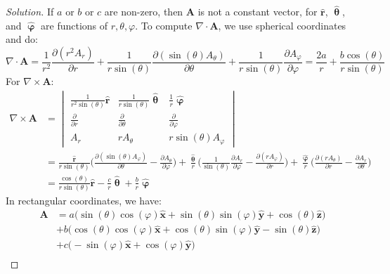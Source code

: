 \documentclass{article}
\theoremstyle{mystyle}
\begin{document}
\begin{proof}[Solution]
If $a$ or $b$ or $c$ are non-zero, then $\mathbf{A}$ is not a constant vector, for $\hat{\mathbf{r}}$, $\hat{\boldsymbol{\uptheta}}$, and $\hat{\boldsymbol{\upvarphi}}$ are functions of $r,\theta,\varphi$. To compute $\nabla \cdot \mathbf{A}$, we use spherical coordinates and do:
\begin{equation*}
    \nabla\cdot\mathbf{A}=\frac{1}{r^{2}}\frac{\partial (r^{2}A_{r})}{\partial r}+\frac{1}{r\sin(\theta)}\frac{\partial(\sin(\theta)A_{\theta})}{\partial \theta}+\frac{1}{r\sin(\theta)}\frac{\partial A_{\varphi}}{\partial\varphi}=\frac{2a}{r}+\frac{b\cos(\theta)}{r\sin(\theta)}
\end{equation*}
For $\nabla \times \mathbf{A}$:
\begin{align*}
    \nabla \times \mathbf{A} &= \begin{vmatrix} \frac{1}{r^{2}\sin(\theta)}\hat{\mathbf{r}} & \frac{1}{r\sin(\theta)}\hat{\boldsymbol{\uptheta}} & \frac{1}{r}\hat{\boldsymbol{\upvarphi}}\\ \frac{\partial}{\partial r} & \frac{\partial}{\partial \theta} & \frac{\partial}{\partial \varphi}\\ A_{r} & rA_{\theta} & r\sin(\theta)A_{\varphi} \end{vmatrix}\\
    &= \frac{\hat{\mathbf{r}}}{r\sin(\theta)}\bigg(\frac{\partial (\sin(\theta)A_{\varphi})}{\partial \theta} - \frac{\partial A_{\theta}}{\partial \varphi}\bigg) + \frac{\hat{\boldsymbol{\uptheta}}}{r}\bigg(\frac{1}{\sin(\theta)}\frac{\partial A_{r}}{\partial \varphi} - \frac{\partial (rA_{\varphi})}{\partial r}\bigg)+\frac{\hat{\boldsymbol{\upvarphi}}}{r}\bigg(\frac{\partial (rA_{\theta})}{\partial r} - \frac{\partial A_{r}}{\partial \theta}\bigg)\\
    &= \frac{\cos(\theta)}{r\sin(\theta)}\hat{\mathbf{r}}-\frac{c}{r}\hat{\boldsymbol{\uptheta}}+\frac{b}{r}\hat{\boldsymbol{\upvarphi}}
\end{align*}
In rectangular coordinates, we have:
\begin{align*}
    \mathbf{A}  &= a\big(\sin(\theta)\cos(\varphi)\hat{\mathbf{x}}+\sin(\theta)\sin(\varphi)\hat{\mathbf{y}}+\cos(\theta)\hat{\mathbf{z}}\big)\\
                &+ b\big(\cos(\theta)\cos(\varphi)\hat{\mathbf{x}} + \cos(\theta)\sin(\varphi)\hat{\mathbf{y}}-\sin(\theta)\hat{\mathbf{z}}\big)\\
                &+ c\big(-\sin(\varphi)\hat{\mathbf{x}} + \cos(\varphi)\hat{\mathbf{y}}\big)\\

\end{align*}
\end{proof}
\end{document}

